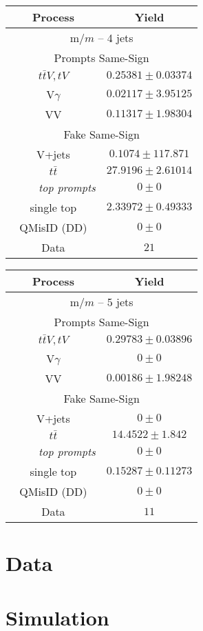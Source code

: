 \begin{tabular}{|c|c|}\hline Process & Yield \\ \hline
\multicolumn{2}{|c|}{ m$\slash{m}$ -- 4 jets } \\ \hline
\multicolumn{2}{|c|}{Prompts Same-Sign} \\ 
 $t\bar{t}V, tV$ & $ 0.25381 \pm 0.03374$ \\ 
 V$\gamma$ & $0.02117 \pm 3.95125$ \\ 
 VV & $0.11317 \pm 1.98304$ \\ \hline 
\multicolumn{2}{|c|}{Fake Same-Sign} \\ 
 V+jets & $0.1074 \pm 117.871$ \\ 
$t\bar{t}$ & $27.9196 \pm 2.61014$ \\ 
 ~ ~ ~ {\it top prompts} & $    0 \pm     0$ \\ 
  single top & $2.33972 \pm 0.49333$ \\ \hline 
 QMisID (DD) & $    0 \pm     0$ \\ \hline 
 Data & $   21$ \\ \hline\hline \end{tabular}


\begin{tabular}{|c|c|}\hline Process & Yield \\ \hline
\multicolumn{2}{|c|}{ m$\slash{m}$ -- 5 jets } \\ \hline
\multicolumn{2}{|c|}{Prompts Same-Sign} \\ 
 $t\bar{t}V, tV$ & $ 0.29783 \pm 0.03896$ \\ 
 V$\gamma$ & $    0 \pm     0$ \\ 
 VV & $0.00186 \pm 1.98248$ \\ \hline 
\multicolumn{2}{|c|}{Fake Same-Sign} \\ 
 V+jets & $    0 \pm     0$ \\ 
$t\bar{t}$ & $14.4522 \pm 1.842$ \\ 
 ~ ~ ~ {\it top prompts} & $    0 \pm     0$ \\ 
  single top & $0.15287 \pm 0.11273$ \\ \hline 
 QMisID (DD) & $    0 \pm     0$ \\ \hline 
 Data & $   11$ \\ \hline\hline \end{tabular}





\section{Data}

\section{Simulation}
